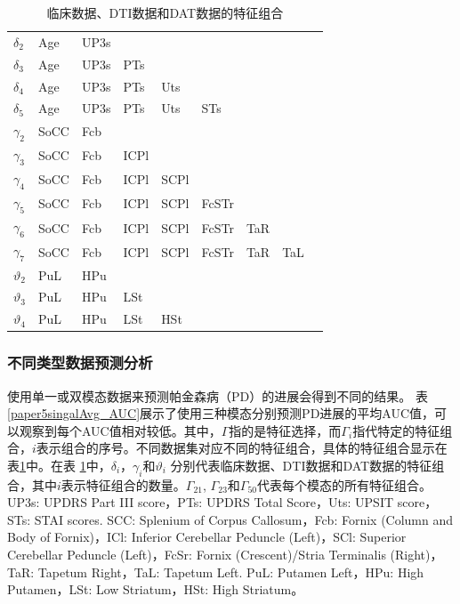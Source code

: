 \begin{table}[ht]
\centering
\caption{临床数据、DTI数据和DAT数据的特征组合 }
\label{paper5combinations}
\begin{tabular}{p{1.5cm}<{\centering}|p{1.3cm}<{\centering}p{1.3cm}<{\centering}p{1.3cm}<{\centering}p{1.3cm}<{\centering}p{1.3cm}<{\centering}p{1.3cm}<{\centering}p{1.3cm}<{\centering}p{1.3cm}<{\centering}}
\hline  \hline
\textbf{$\delta_2$} & Age  & UP3s &      &      &           &     &     \\
\textbf{$\delta_3$} & Age  & UP3s & PTs  &      &           &     &     \\
\textbf{$\delta_4$} & Age  & UP3s & PTs  & Uts  &           &     &     \\
\textbf{$\delta_5$} & Age  & UP3s & PTs  & Uts  & STs       &     &     \\ \hline 
\textbf{$\gamma_2$} & SoCC & Fcb  &      &      & \textbf{} &     &     \\
\textbf{$\gamma_3$} & SoCC & Fcb  & ICPl &      & \textbf{} &     &     \\
\textbf{$\gamma_4$} & SoCC & Fcb  & ICPl & SCPl &           &     &     \\
\textbf{$\gamma_5$} & SoCC & Fcb  & ICPl & SCPl & FcSTr     &     &     \\
\textbf{$\gamma_6$} & SoCC & Fcb  & ICPl & SCPl & FcSTr     & TaR &     \\
\textbf{$\gamma_7$} & SoCC & Fcb  & ICPl & SCPl & FcSTr     & TaR & TaL \\ \hline 
\textbf{$\vartheta_2$}    & PuL  & HPu  &      &      &           &     &     \\
\textbf{$\vartheta_3$}    & PuL  & HPu  & LSt  &      &           &     &     \\
\textbf{$\vartheta_4$}    & PuL  & HPu  & LSt  & HSt  &           &     &    \\\hline \hline
\end{tabular}
\end{table}


\subsubsection{不同类型数据预测分析}
使用单一或双模态数据来预测帕金森病（PD）的进展会得到不同的结果。
表\ref{paper5singalAvg_AUC}展示了使用三种模态分别预测PD进展的平均AUC值，可以观察到每个AUC值相对较低。其中，$\Gamma$指的是特征选择，而$\Gamma_i$指代特定的特征组合，$i$表示组合的序号。不同数据集对应不同的特征组合，具体的特征组合显示在表\ref{paper5combinations}中。在表 \ref{paper5combinations}中，$\delta_{i}$，$\gamma_{i}$和$\vartheta_{i}$ 分别代表临床数据、DTI数据和DAT数据的特征组合，其中$i$表示特征组合的数量。$\Gamma_{21}$, $\Gamma_{23}$和$\Gamma_{50}$代表每个模态的所有特征组合。UP3s: UPDRS Part III score，PTs: UPDRS Total Score，Uts: UPSIT score，STs: STAI scores. SCC: Splenium of Corpus Callosum，Fcb: Fornix (Column and Body of Fornix)，ICl: Inferior Cerebellar Peduncle (Left)，SCl: Superior Cerebellar Peduncle (Left)，FcSr: Fornix (Crescent)/Stria Terminalis (Right)，TaR: Tapetum Right，TaL: Tapetum Left. PuL: Putamen Left，HPu: High Putamen，LSt: Low Striatum，HSt: High Striatum。


